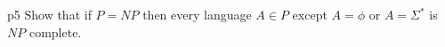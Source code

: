 \documentclass[a4paper, 11pt]{article}
\begin{document}
	
	
%	
	
	
	\begin{problem}{%
		}{p5%
		}
		Show that if $P = N P$ then every language $A \in P$ except $A = \phi$ or $A = \Sigma^{*}$ is $N P$ complete.		
	\end{problem}
	
\end{document}

